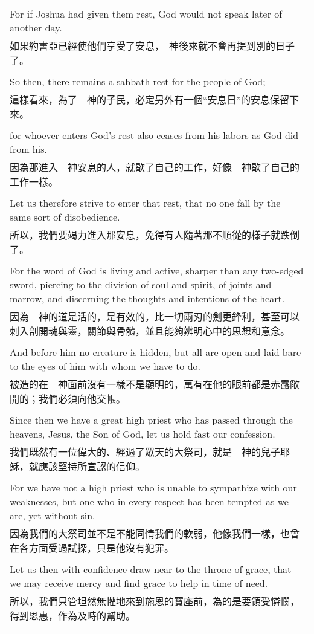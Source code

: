 \begin{tabularx}{\textwidth}{p{}}
For if Joshua had given them rest, God would not speak later of another day. \\
如果約書亞已經使他們享受了安息，　神後來就不會再提到別的日子了。 \\ \\
So then, there remains a sabbath rest for the people of God; \\
這樣看來，為了　神的子民，必定另外有一個“安息日”的安息保留下來。 \\ \\
for whoever enters God's rest also ceases from his labors as God did from his. \\
因為那進入　神安息的人，就歇了自己的工作，好像　神歇了自己的工作一樣。 \\ \\
Let us therefore strive to enter that rest, that no one fall by the same sort of disobedience. \\
所以，我們要竭力進入那安息，免得有人隨著那不順從的樣子就跌倒了。 \\ \\
For the word of God is living and active, sharper than any two-edged sword, piercing to the division of soul and spirit, of joints and marrow, and discerning the thoughts and intentions of the heart. \\
因為　神的道是活的，是有效的，比一切兩刃的劍更鋒利，甚至可以刺入剖開魂與靈，關節與骨髓，並且能夠辨明心中的思想和意念。 \\ \\
And before him no creature is hidden, but all are open and laid bare to the eyes of him with whom we have to do. \\
被造的在　神面前沒有一樣不是顯明的，萬有在他的眼前都是赤露敞開的；我們必須向他交帳。 \\ \\
Since then we have a great high priest who has passed through the heavens, Jesus, the Son of God, let us hold fast our confession. \\
我們既然有一位偉大的、經過了眾天的大祭司，就是　神的兒子耶穌，就應該堅持所宣認的信仰。 \\ \\
For we have not a high priest who is unable to sympathize with our weaknesses, but one who in every respect has been tempted as we are, yet without sin. \\
因為我們的大祭司並不是不能同情我們的軟弱，他像我們一樣，也曾在各方面受過試探，只是他沒有犯罪。 \\ \\
Let us then with confidence draw near to the throne of grace, that we may receive mercy and find grace to help in time of need. \\
所以，我們只管坦然無懼地來到施恩的寶座前，為的是要領受憐憫，得到恩惠，作為及時的幫助。 \\ \\

\hline
\end{tabularx}

